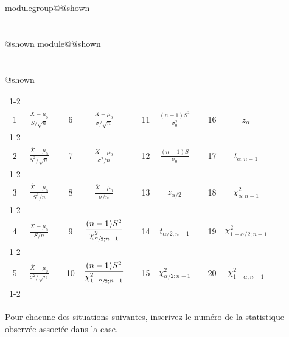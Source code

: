 \documentclass{Evaluation}
\makeatletter
\newcommand{\currentmodulekey}{}
\newcommand{\currentmoduletitle}{}
\newcommand{\currentgroupkey}{}
\newcommand{\currentgrouptitle}{}
\newcommand{\showmoduleifneeded}{%
  \ifx\currentgroupkey\empty\else
    \expandafter\ifx\csname modulegroup@\currentgroupkey @shown\endcsname\relax
      \section*{\currentgrouptitle}%
      \expandafter\gdef\csname modulegroup@\currentgroupkey @shown\endcsname{1}%
    \fi
  \fi
  \expandafter\ifx\csname module@\currentmodulekey @shown\endcsname\relax
    \section*{\currentmoduletitle}%
    \expandafter\gdef\csname module@\currentmodulekey @shown\endcsname{1}%
  \fi
}
\newenvironment{A24}{\showmoduleifneeded}{}
\makeatother
\begin{document}
\begin{questions}
\begin{A24}
\begin{center}
\begin{tabular}{|c|c|c|c|c|c|c|c|c|c|c|}
\cline{1-2}\cline{4-5}\cline{7-8}\cline{10-11}&&&&&&&&&&\\[-3mm]

1
& $\displaystyle \frac{\overline{X}-\mu_0}{S/\sqrt{n}}$
&
& 6
& $\displaystyle \frac{\overline{X}-\mu_0}{\sigma/\sqrt{n}}$
&
&11
& $\displaystyle \frac{ (n-1)S^2}{ \sigma_0^2}$
&
&16
& $z_{\alpha}$
\\[4mm]

\cline{1-2}\cline{4-5}\cline{7-8}\cline{10-11}&&&&&&&&&&\\[-3mm]
2
& $\displaystyle \frac{\overline{X}-\mu_0}{S^2/\sqrt{n}}$
&
& 7
& $\displaystyle \frac{\overline{X}-\mu_0}{\sigma^2/n}$
&
&12
& $\displaystyle  \frac{ (n-1)S}{\sigma_0}$
&
&17
& $t_{\alpha;n-1}$
\\[4mm]
\cline{1-2}\cline{4-5}\cline{7-8}\cline{10-11}&&&&&&&&&&\\[-3mm]
3
& $\displaystyle \frac{\overline{X}-\mu_0}{S^2/n}$
&
& 8
& $\displaystyle \frac{\overline{X}-\mu_0}{\sigma/n}$
&
&13
& $z_{\alpha/2}$
&
&18
& $\chi^2_{\alpha;n-1}$
\\[4mm]
\cline{1-2}\cline{4-5}\cline{7-8}\cline{10-11}&&&&&&&&&&\\[-3mm]
4
& $\displaystyle \frac{\overline{X}-\mu_0}{S/n}$
&
& 9
& $\displaystyle\frac{ (n-1)S^2}{ \chi_{\sfrac{\alpha}{2};n-1}^2}$
&
&14
& $t_{\alpha/2;n-1}$
&
&19
& $\chi^2_{1-\alpha/2;n-1}$
\\[4mm]
\cline{1-2}\cline{4-5}\cline{7-8}\cline{10-11}&&&&&&&&&&\\[-3mm]
5
& $\displaystyle \frac{\overline{X}-\mu_0}{\sigma^2/\sqrt{n}}$
&
& 10
& $\displaystyle\frac{ (n-1)S^2}{ \chi_{1-\sfrac{\alpha}{2};n-1}^2}$
&
&15
& $\chi^2_{\alpha/2;n-1}$
&
&20
& $\chi^2_{1-\alpha;n-1}$
\\[4mm]
\cline{1-2}\cline{4-5}\cline{7-8}\cline{10-11}
\end{tabular}

\end{center}

Pour chacune des situations suivantes, inscrivez le numéro de la statistique observée associée dans la case.

\end{A24}
\end{questions}
\end{document}
